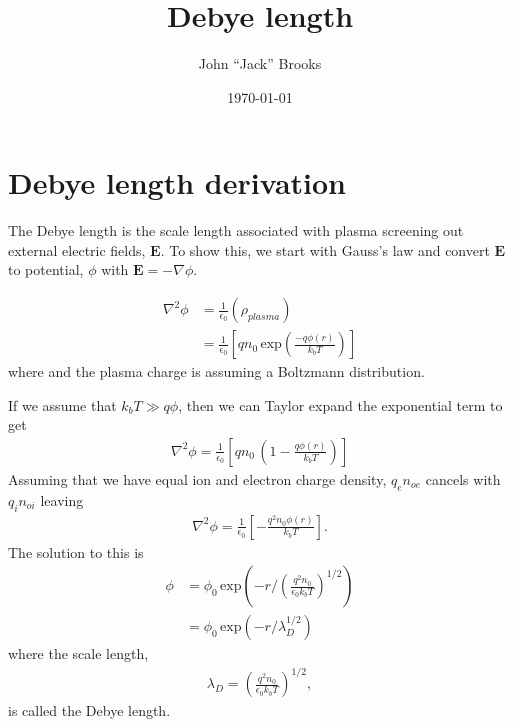 \documentclass{article}
\title{Debye length}
\author{John ``Jack'' Brooks}
\date\today
\begin{document}
	
	
\maketitle %
	


\section{Debye length derivation}
The Debye length is the scale length associated with plasma screening out external electric fields, $\mathbf{E}$.  To show this, we start with Gauss's law and convert $\mathbf{E}$ to potential, $\phi$ with $\mathbf{E} = - \nabla \phi$.  

\begin{equation}
\begin{split}
	\nabla^2 \phi &= \frac{1}{\epsilon_0}\left( \rho_{plasma} \right) \\
	&= \frac{1}{\epsilon_0}\left[ q n_0 \, \textrm{exp} \left( \frac{-q \phi (r)}{k_b T} \right)\right] 
\end{split}
\end{equation}
where and the plasma charge is assuming a Boltzmann distribution.  

If we assume that $k_bT \gg q\phi$, then we can Taylor expand the exponential term to get
\begin{equation}
\begin{split}
\nabla^2 \phi = \frac{1}{\epsilon_0}\left[ q n_0 \,  \left(1- \frac{q \phi (r)}{k_b T} \right)\right]
\end{split}
\end{equation}
Assuming that we have equal ion and electron charge density, $q_e n_{oe}$ cancels with $q_i n_{oi}$ leaving
\begin{equation}
\begin{split}
\nabla^2 \phi = \frac{1}{\epsilon_0}\left[ -   \frac{q^2 n_0 \phi (r)}{k_b T}  \right].
\end{split}
\end{equation}
The solution to this is 
\begin{equation}
\begin{split}
\phi &= \phi_0 \, \textrm{exp} \left( -r / \left( \frac{q^2n_0}{\epsilon_0 k_b T} \right)^{1/2} \right) \\
 &= \phi_0 \, \textrm{exp} \left( -r /\lambda_D^{1/2} \right)
\end{split}
\end{equation}
where the scale length, 
\begin{equation}
\begin{split}
 \lambda_D =  \left( \frac{q^2n_0}{\epsilon_0 k_b T} \right)^{1/2},
\end{split}
\end{equation}
is called the Debye length.
\end{document}
